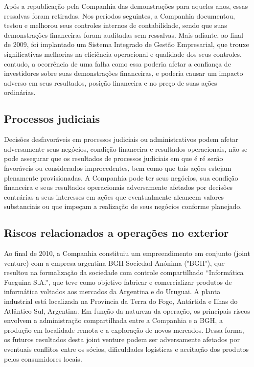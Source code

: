 {{{Após a republicação pela Companhia das demonstrações para aqueles anos, essas ressalvas foram retiradas. Nos períodos seguintes, a Companhia documentou, testou e melhorou seus controles internos de contabilidade, sendo que suas demonstrações financeiras foram auditadas sem ressalvas. Mais adiante, ao final de 2009, foi implantado um Sistema Integrado de Gestão Empresarial, que trouxe significativas melhorias na eficiência operacional e qualidade dos seus controles, contudo, a ocorrência de uma falha como essa poderia afetar a confiança de investidores sobre suas demonstrações financeiras, e poderia causar um impacto adverso em seus resultados, posição financeira e no preço de suas ações ordinárias.

\subsection{Processos judiciais}
Decisões desfavoráveis em processos judiciais ou administrativos podem afetar adversamente seus negócios, condição financeira e resultados operacionais, não se pode assegurar que os resultados de processos judiciais em que é ré serão favoráveis ou considerados improcedentes, bem como que tais ações estejam plenamente provisionadas. A Companhia pode ter seus negócios, sua condição financeira e seus resultados operacionais adversamente afetados por decisões contrárias a seus interesses em ações que eventualmente alcancem valores substanciais ou que impeçam a realização de seus negócios conforme planejado.

\subsection{Riscos relacionados a operações no exterior}
Ao final de 2010, a Companhia constituiu um empreendimento em conjunto (joint venture) com a empresa argentina BGH Sociedad Anónima ("BGH"), que resultou na formalização da sociedade com controle compartilhado “Informática Fueguina S.A.”, que teve como objetivo fabricar e comercializar produtos de informática voltados aos mercados da Argentina e do Uruguai. A planta industrial está localizada na Província da Terra do Fogo, Antártida e Ilhas do Atlântico Sul, Argentina. Em função da natureza da operação, os principais riscos envolvem a administração compartilhada entre a Companhia e a BGH, a produção em localidade remota e a exploração de novos mercados. Dessa forma, os futuros resultados desta joint venture podem ser adversamente afetados por eventuais conflitos entre os sócios, dificuldades logísticas e aceitação dos produtos pelos consumidores locais. 

}}}
